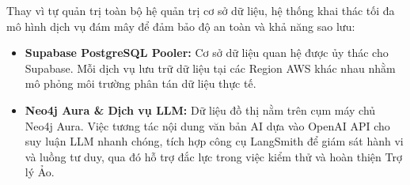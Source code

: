 Thay vì tự quản trị toàn bộ hệ quản trị cơ sở dữ liệu, hệ thống khai thác tối đa mô hình dịch vụ đám mây để đảm bảo độ an toàn và khả năng sao lưu:
\begin{itemize}
    \item \textbf{Supabase PostgreSQL Pooler:} Cơ sở dữ liệu quan hệ được ủy thác cho Supabase. Mỗi dịch vụ lưu trữ dữ liệu tại các Region AWS khác nhau nhằm mô phỏng môi trường phân tán dữ liệu thực tế.
    \item \textbf{Neo4j Aura \& Dịch vụ LLM:} Dữ liệu đồ thị nằm trên cụm máy chủ Neo4j Aura. Việc tương tác nội dung văn bản AI dựa vào OpenAI API cho suy luận LLM nhanh chóng, tích hợp công cụ LangSmith để giám sát hành vi và luồng tư duy, qua đó hỗ trợ đắc lực trong việc kiểm thử và hoàn thiện Trợ lý Ảo.
\end{itemize}
